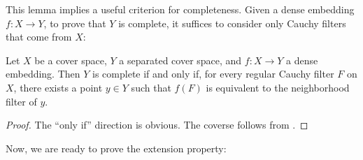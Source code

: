 \documentclass[reqno]{amsart}
\theoremstyle{definition}
\theoremstyle{remark}
\numberwithin{figure}{section}
\begin{document}
This lemma implies a useful criterion for completeness.
Given a dense embedding $f : X \to Y$, to prove that $Y$ is complete, it suffices to consider only Cauchy filters that come from $X$:

\begin{lem}
Let $X$ be a cover space, $Y$ a separated cover space, and $f : X \to Y$ a dense embedding.
Then $Y$ is complete if and only if, for every regular Cauchy filter $F$ on $X$, there exists a point $y \in Y$ such that $f(F)$ is equivalent to the neighborhood filter of $y$.
\end{lem}
\begin{proof}
The ``only if'' direction is obvious.
The coverse follows from .
\end{proof}

Now, we are ready to prove the extension property:
\end{document}
